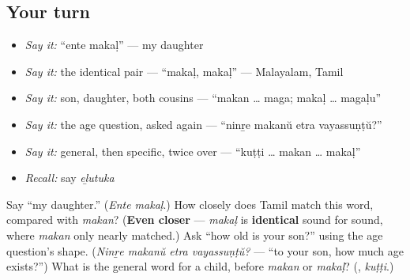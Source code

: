 \subsection*{Your turn}
\begin{itemize}
\raggedright
  \item \emph{Say it:} \textquotedblleft{}ente makaḷ\textquotedblright{} — my daughter
  \item \emph{Say it:} the identical pair — \textquotedblleft{}makaḷ, makaḷ\textquotedblright{} — Malayalam, Tamil
  \item \emph{Say it:} son, daughter, both cousins — \textquotedblleft{}makan … maga; makaḷ … magaḷu\textquotedblright{}
  \item \emph{Say it:} the age question, asked again — \textquotedblleft{}ninṟe makanŭ etra vayassuṇṭŭ?\textquotedblright{}
  \item \emph{Say it:} general, then specific, twice over — \textquotedblleft{}kuṭṭi … makan … makaḷ\textquotedblright{}
  \item \emph{Recall:} say \emph{eḻutuka}
\end{itemize}

\begin{tcolorbox}[breakable,colback=teal!4,colframe=teal!35!black,title={Before you move on}]
Say \textquotedblleft{}my daughter.\textquotedblright{} (\emph{Ente makaḷ}.) How closely does Tamil match this word, compared with \emph{makan}? (\textbf{Even closer} — \emph{makaḷ} is \textbf{identical} sound for sound, where \emph{makan} only nearly matched.) Ask \textquotedblleft{}how old is your son?\textquotedblright{} using the age question's shape. (\emph{Ninṟe makanŭ etra vayassuṇṭŭ?} — \textquotedblleft{}to your son, how much age exists?\textquotedblright{}) What is the general word for a child, before \emph{makan} or \emph{makaḷ}? (\textbf{}, \emph{kuṭṭi}.)
\end{tcolorbox}
